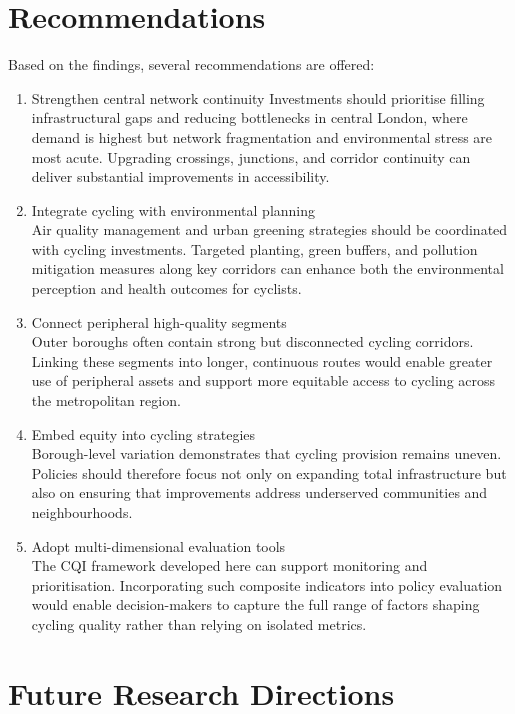 \documentclass[
  12pt,
  oneside]{book}
\begin{document}
\section{Recommendations}\label{recommendations}

Based on the findings, several recommendations are offered:

\begin{enumerate}
\def\labelenumi{\arabic{enumi}.}
\item
  Strengthen central network continuity
  Investments should prioritise filling infrastructural gaps and reducing bottlenecks in central London, where demand is highest but network fragmentation and environmental stress are most acute. Upgrading crossings, junctions, and corridor continuity can deliver substantial improvements in accessibility.
\item
  Integrate cycling with environmental planning\\
  Air quality management and urban greening strategies should be coordinated with cycling investments. Targeted planting, green buffers, and pollution mitigation measures along key corridors can enhance both the environmental perception and health outcomes for cyclists.
\item
  Connect peripheral high-quality segments\\
  Outer boroughs often contain strong but disconnected cycling corridors. Linking these segments into longer, continuous routes would enable greater use of peripheral assets and support more equitable access to cycling across the metropolitan region.
\item
  Embed equity into cycling strategies\\
  Borough-level variation demonstrates that cycling provision remains uneven. Policies should therefore focus not only on expanding total infrastructure but also on ensuring that improvements address underserved communities and neighbourhoods.
\item
  Adopt multi-dimensional evaluation tools\\
  The CQI framework developed here can support monitoring and prioritisation. Incorporating such composite indicators into policy evaluation would enable decision-makers to capture the full range of factors shaping cycling quality rather than relying on isolated metrics.
\end{enumerate}

\section{Future Research Directions}\label{future-research-directions}
\end{document}
